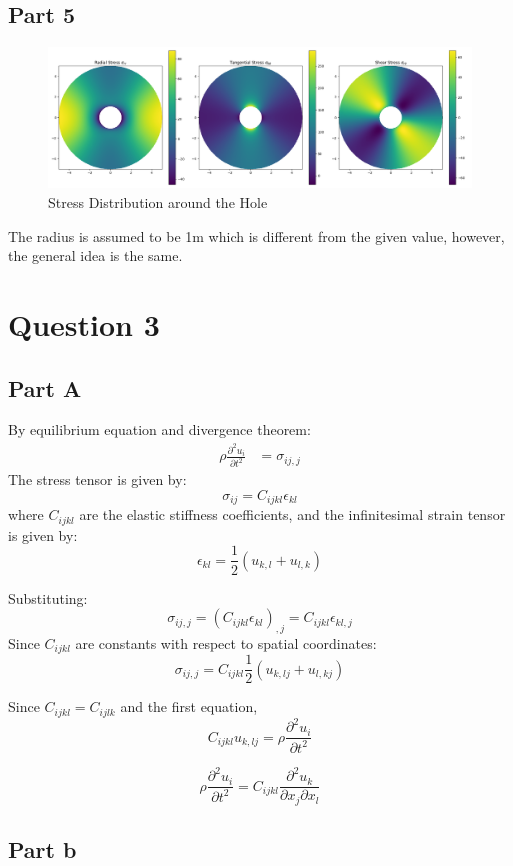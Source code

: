 \documentclass[12pt]{article} %
\begin{document}
\subsection{Part 5}
\begin{figure}[ht]
    \centering
    \includegraphics[width=1\textwidth]{Q2.png}
    \caption{Stress Distribution around the Hole}
\end{figure}
The radius is assumed to be 1m which is different from the given value, however, the general idea is the same.
\section{Question 3}
\subsection{Part A}
By equilibrium equation and divergence theorem:
\begin{align*}
    \rho \frac{\partial^2 u_i}{\partial t^2} &= \sigma_{ij,j}
\end{align*}
The stress tensor is given by:
\[
\sigma_{ij} = C_{ijkl} \epsilon_{kl}
\]
where \(C_{ijkl}\) are the elastic stiffness coefficients, and the infinitesimal strain tensor is given by:
\[
\epsilon_{kl} = \frac{1}{2} (u_{k,l} + u_{l,k})
\]

Substituting:
\[
\sigma_{ij,j} = (C_{ijkl} \epsilon_{kl})_{,j} = C_{ijkl} \epsilon_{kl,j}
\]
Since \(C_{ijkl}\) are constants with respect to spatial coordinates:
\[
\sigma_{ij,j} = C_{ijkl} \frac{1}{2} (u_{k,lj} + u_{l,kj})
\]


Since \(C_{ijkl} = C_{ijlk}\) and the first equation,
\[
C_{ijkl} u_{k,lj} = \rho \frac{\partial^2 u_i}{\partial t^2}
\]

\[
\rho \frac{\partial^2 u_i}{\partial t^2} = C_{ijkl} \frac{\partial^2 u_k}{\partial x_j \partial x_l}
\]

\subsection{Part b}
\end{document}
